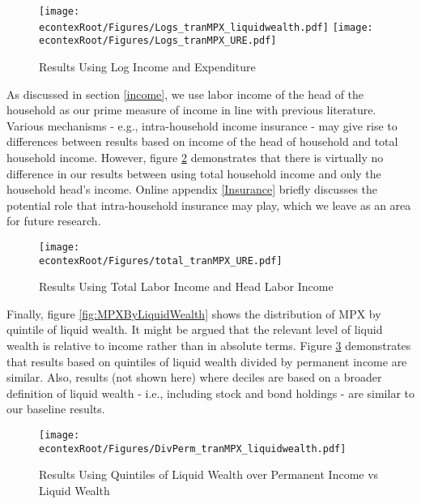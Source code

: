 \documentclass[titlepage]{\econtex}\newcommand{\texname}{ConsumptionHeterogeneity}
\begin{document}
\begin{figure} 
	\begin{centering}
		\texttt{[image: \\econtexRoot/Figures/Logs\_tranMPX\_liquidwealth.pdf]}
		\texttt{[image: \\econtexRoot/Figures/Logs\_tranMPX\_URE.pdf]}
		\caption{Results Using Log Income and Expenditure}
		\label{fig:Robust_Logs}
	\end{centering}
\end{figure}

As discussed in section \ref{income}, we use labor income of the head of the household as our prime measure of income in line with previous literature. Various mechanisms - e.g., intra-household income insurance - may give rise to differences between results based on income of the head of household and total household income. However, figure \ref{fig:Robust_TotalvsHead} demonstrates that there is virtually no difference in our results between using total household income and only the household head's income. Online appendix \ref{Insurance} briefly discusses the potential role that intra-household insurance may play, which we leave as an area for future research. 

\begin{figure} 
	\begin{centering}
		\texttt{[image: \\econtexRoot/Figures/total\_tranMPX\_URE.pdf]}
		\caption{Results Using Total Labor Income and Head Labor Income}
		\label{fig:Robust_TotalvsHead}
	\end{centering}
\end{figure}

Finally, figure \ref{fig:MPXByLiquidWealth} shows the distribution of MPX by quintile of liquid wealth. It might be argued that the relevant level of liquid wealth is relative to income rather than in absolute terms. Figure \ref{fig:Robust_DivPerm} demonstrates that results based on quintiles of liquid wealth divided by permanent income are similar. Also, results (not shown here) where deciles are based on a broader definition of liquid wealth - i.e., including stock and bond holdings - are similar to our baseline results. 

\begin{figure} 
	\begin{centering}
		\texttt{[image: \\econtexRoot/Figures/DivPerm\_tranMPX\_liquidwealth.pdf]}
		\caption{Results Using Quintiles of Liquid Wealth over Permanent Income vs Liquid Wealth}
		\label{fig:Robust_DivPerm}
	\end{centering}
\end{figure}
\end{document}
